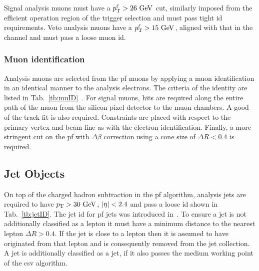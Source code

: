 Signal analysis muons must have a $p_{\mathrm{T}}^{\ell}>26\mathrm{~Ge\hspace{-.08em}V}^{}$ cut, similarly imposed from the efficient operation region of the \muTrigger{} trigger selection and must pass tight \acrshort{id} requirements.
Veto analysis muons have a $p_{\mathrm{T}}^{\ell}>15\mathrm{~Ge\hspace{-.08em}V}^{}$, aligned with that in the \eJets{} channel and must pass a loose muon \acrshort{id}.

\subsubsection{Muon identification}
Analysis muons are selected from the \acrshort{pf} muons by applying a muon identification in an identical manner to the analysis electrons.
The criteria of the identity are listed in Tab.~\ref{tb:muID}~\cite{Event:MuonSF}.
For signal muons, hits are required along the entire path of the muon from the silicon pixel detector to the muon chambers.
A good \chisndf{} of the track fit is also required.
Constraints are placed with respect to the primary vertex and beam line as with the electron identification.
Finally, a more stringent cut on the \acrshort{pf} \Irel{} with $\Delta\beta$ correction using a cone size of $\Delta R < 0.4$ is required.


\subsection{Jet Objects}
\label{sec:jet}

On top of the charged hadron subtraction in the \acrshort{pf} algorithm, analysis jets are required to have $p_{\mathrm{T}}>30\mathrm{~Ge\hspace{-.08em}V}^{}$, $\lvert \eta \rvert<2.4$ and pass a loose \acrshort{id} shown in Tab.~\ref{tb:jetID}.
The jet \acrshort{id} for \acrshort{pf} jets was introduced in~\cite{Event:JetID}.
To ensure a jet is not additionally classified as a lepton it must have a minimum distance to the nearest lepton $\Delta R > 0.4$.
If the jet is close to a lepton then it is assumed to have originated from that lepton and is consequently removed from the jet collection. 
A jet is additionally classified as a \bquark{} jet, if it also passes the medium working point of the \acrshort{csv} algorithm.


